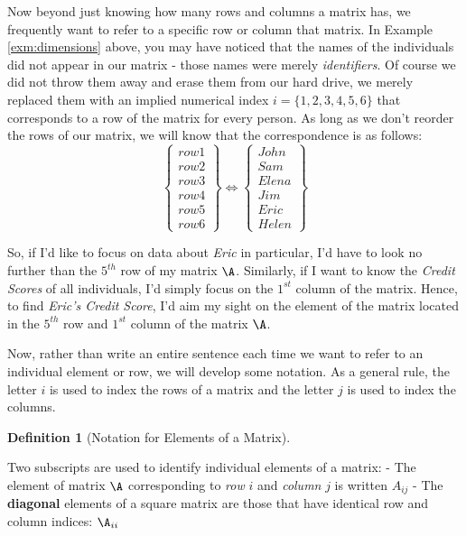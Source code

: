 \documentclass[
]{article}
\theoremstyle{definition}
\newtheorem{definition}{Definition}[section]
\theoremstyle{definition}
\theoremstyle{definition}
\theoremstyle{definition}
\theoremstyle{remark}
\begin{document}
Now beyond just knowing how many rows and columns a matrix has, we frequently want to refer to a specific row or column that matrix. In Example \ref{exm:dimensions} above, you may have noticed that the names of the individuals did not appear in our matrix - those names were merely \emph{identifiers}. Of course we did not throw them away and erase them from our hard drive, we merely replaced them with an implied numerical index \(i=\{1,2,3,4,5,6\}\) that corresponds to a row of the matrix for every person. As long as we don't reorder the rows of our matrix, we will know that the correspondence is as follows:
\[\left\lbrace \begin{array}{c}
row 1\\ row 2\\ row 3\\ row 4\\ row 5\\ row 6
\end{array}  \right\rbrace \Longleftrightarrow
\left\lbrace \begin{array}{c}
John\\ Sam\\ Elena\\ Jim\\ Eric\\ Helen
\end{array}  \right\rbrace\]

So, if I'd like to focus on data about \emph{Eric} in particular, I'd have to look no further than the \(5^{th}\) row of my matrix \(\A\). Similarly, if I want to know the \emph{Credit Scores} of all individuals, I'd simply focus on the \(1^{st}\) column of the matrix. Hence, to find \emph{Eric's Credit Score}, I'd aim my sight on the element of the matrix located in the \(5^{th}\) row and \(1^{st}\) column of the matrix \(\A\).

Now, rather than write an entire sentence each time we want to refer to an individual element or row, we will develop some notation. As a general rule, the letter \(i\) is used to index the rows of a matrix and the letter \(j\) is used to index the columns.

\begin{definition}[Notation for Elements of a Matrix]
\protect\hypertarget{def:ijnotdef}{}\label{def:ijnotdef}

Two subscripts are used to identify individual elements of a matrix:
- The element of matrix \(\A\) corresponding to \emph{row} \(i\) and \emph{column} \(j\) is written \(A_{ij}\)
- The \textbf{diagonal} elements of a square matrix are those that have identical row and column indices: \(\A_{ii}\)

\end{definition}
\end{document}
